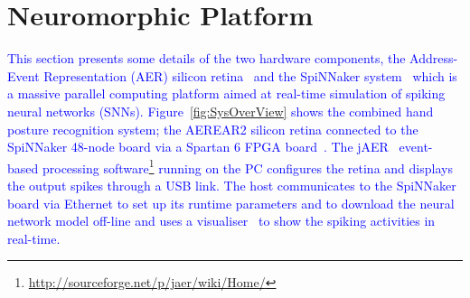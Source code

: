 \documentclass[journal]{journal}
\begin{document}
\section{Neuromorphic Platform}
\textcolor{blue}{
This section presents some details of the two hardware components, the Address-Event Representation (AER) silicon retina~\cite{lenero20113} and the SpiNNaker system~\cite{furber2014spinnaker} which is a massive parallel computing platform aimed at real-time simulation of spiking neural networks (SNNs). 
Figure~\ref{fig:SysOverView} shows the combined hand posture recognition system; 
the AEREAR2 silicon retina connected to the SpiNNaker 48-node board via a Spartan 6 FPGA board~\cite{galluppi2012real}.%
The jAER~\cite{delbruck2008frame} event-based processing software\footnote{\url{http://sourceforge.net/p/jaer/wiki/Home/}} running on the PC configures the retina and displays the output spikes through a USB link.
The host communicates to the SpiNNaker board via Ethernet to set up its runtime parameters and to download the neural network model off-line and uses a visualiser~\cite{6252490} to show the spiking activities in real-time.
}
\end{document}
